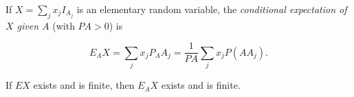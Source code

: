 If $X = \sum_j x_j I_{A_j}$ is an elementary random variable, the \textit{conditional expectation of $X$ given $A$} (with $PA > 0$) is

$$E_A X = \sum_j x_j P_A A_j = \frac{1}{PA} \sum_j x_j P(A A_j).$$

If $EX$ exists and is finite, then $E_A X$ exists and is finite.
